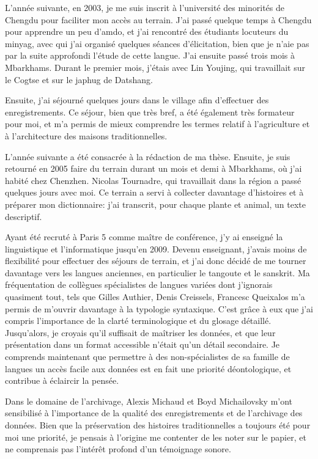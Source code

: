 \documentclass[oldfontcommands,oneside,a4paper,11pt]{memoir}
\begin{document}
L'année suivante, en 2003, je me suis inscrit à l'université des minorités de Chengdu pour faciliter mon accès au terrain. J'ai passé quelque temps à Chengdu pour apprendre un peu d'amdo, et j'ai rencontré des étudiants locuteurs du minyag, avec qui j'ai organisé  quelques séances d'élicitation, bien que je n'aie pas par la suite approfondi l'étude de cette langue. J'ai ensuite passé trois mois à Mbarkhams. Durant le premier mois, j'étais avec Lin Youjing, qui travaillait sur le Cogtse et sur le japhug de Datshang.  

Ensuite, j'ai séjourné quelques jours dans le village afin d'effectuer des enregistrements. Ce séjour, bien que très bref, a été également très formateur pour moi, et m'a permis de mieux comprendre les termes relatif à l'agriculture et à l'architecture des maisons traditionnelles.

L'année suivante a été consacrée à la rédaction de ma thèse. Ensuite, je suis retourné en 2005 faire du terrain durant un mois et demi à Mbarkhams, où j'ai habité chez Chenzhen. Nicolas Tournadre, qui travaillait dans la région a passé quelques jours avec moi. Ce terrain a servi à collecter davantage d'histoires et à préparer mon dictionnaire: j'ai transcrit, pour chaque plante et animal, un texte descriptif.

Ayant été recruté à Paris 5 comme maître de conférence, j'y ai enseigné la linguistique et l'informatique jusqu'en 2009. Devenu enseignant, j'avais moins de flexibilité pour effectuer des séjours de terrain, et j'ai donc décidé de me tourner davantage vers les langues anciennes, en particulier le tangoute et le sanskrit. Ma fréquentation de collègues spécialistes de langues variées dont j'ignorais quasiment tout, tels que Gilles Authier, Denis Creissels, Francesc Queixalos m'a permis de m'ouvrir davantage à la typologie syntaxique. C'est grâce à eux que j'ai compris l'importance de la clarté terminologique et du glosage détaillé. Jusqu'alors, je croyais qu'il suffisait de maîtriser les données, et que leur présentation dans un format accessible n'était qu'un détail secondaire. Je comprends maintenant que permettre à des non-spécialistes de sa famille de langues   un accès facile aux données est en fait une priorité déontologique,   et contribue à   éclaircir la pensée.

Dans le domaine de l'archivage, Alexis Michaud et Boyd Michailovsky m'ont sensibilisé  à l'importance de la qualité des enregistrements et de l'archivage des données. Bien que la préservation des histoires traditionnelles a toujours été pour moi une priorité, je pensais à l'origine me contenter de les noter sur le papier, et ne comprenais pas l'intérêt profond d'un témoignage sonore. 
\end{document}
